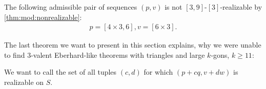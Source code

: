 \begin{example}
  The following admissible pair of sequences $(p, v)$ is not $[3, 9]$-$[3]$-realizable by \autoref{thm:mod:nonrealizable}:
  \begin{align*}
    p = [4 \times 3, 6], v = [6 \times 3].
  \end{align*}
\end{example}

The last theorem we want to present in this section explains, why we were unable to find $3$-valent {\sc Eberhard}-like theorems with triangles and large $k$-gons, $k \geq 11$:

\begin{definition}
  We want to call  the set of all tuples $(c, d)$ for which $(p + c q, v + d w)$ is realizable on $S$.
\end{definition}

